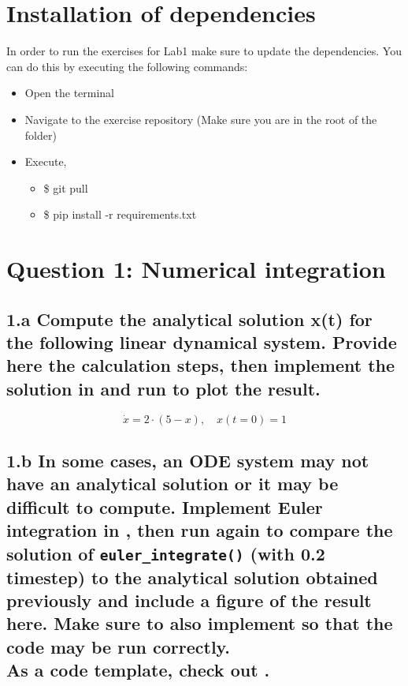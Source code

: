 \documentclass{cmc}
\begin{document}
\section*{Installation of dependencies}
\label{sec:inst-depend}

In order to run the exercises for Lab1 make sure to update the
dependencies.  You can do this by executing the following commands:

\begin{itemize}
\item Open the terminal
\item Navigate to the exercise repository (Make sure you are in the
  root of the folder)
\item Execute,
  \begin{itemize}
  	\item \$ git pull
  	\item \$ pip install -r requirements.txt
  \end{itemize}
\end{itemize}

\newpage
\section*{Question 1: Numerical integration}

\subsection*{1.a Compute the analytical solution x(t) %
  for the following linear dynamical system. Provide here the calculation steps,
  then implement the solution in
  and run  to plot the result.}

\begin{equation}
  \label{eq:ode-1}
  \dot{x} = 2 \cdot (5 - x), \quad x(t=0)=1
\end{equation}


\vspace{0.3\textheight}


\newpage
\subsection*{1.b In some cases, an ODE system may not have an analytical
  solution or it may be difficult to compute. Implement Euler integration in
  , %
  then run  again to compare the solution of
  \texttt{eu\-ler\_integr\-ate()} (with 0.2 timestep) %
  to the analytical solution obtained previously and include a figure of the
  result here. Make sure to also implement
  so that the code may be run correctly. \\ As a code template, check out
  .}
\end{document}
